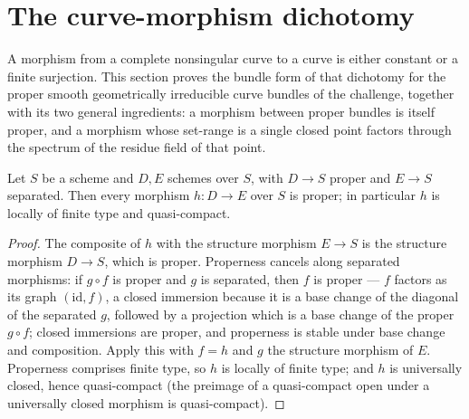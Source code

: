 \section{The curve-morphism dichotomy}
\label{sec:curve_morphism_dichotomy}

A morphism from a complete nonsingular curve to a curve is either constant or a finite
surjection. This section proves the bundle form of that dichotomy for the proper smooth
geometrically irreducible curve bundles of the challenge, together with its two general
ingredients: a morphism between proper bundles is itself proper, and a morphism whose
set-range is a single closed point factors through the spectrum of the residue field of
that point.

\begin{theorem}
  \label{thm:overHom_isProper}
  \leanok
  Let \(S\) be a scheme and \(D, E\) schemes over \(S\), with \(D \to S\) proper and
  \(E \to S\) separated. Then every morphism \(h : D \to E\) over \(S\) is proper; in
  particular \(h\) is locally of finite type and quasi-compact.
\end{theorem}
\begin{proof}
  \leanok
  The composite of \(h\) with the structure morphism \(E \to S\) is the structure
  morphism \(D \to S\), which is proper. Properness cancels along separated morphisms:
  if \(g \circ f\) is proper and \(g\) is separated, then \(f\) is proper --- \(f\)
  factors as its graph \((\mathrm{id}, f)\), a closed immersion because it is a base
  change of the diagonal of the separated \(g\), followed by a projection which is a
  base change of the proper \(g \circ f\); closed immersions are proper, and properness
  is stable under base change and composition. Apply this with \(f = h\) and \(g\) the
  structure morphism of \(E\). Properness comprises finite type, so \(h\) is locally of
  finite type; and \(h\) is universally closed, hence quasi-compact (the preimage of a
  quasi-compact open under a universally closed morphism is quasi-compact).
\end{proof}

